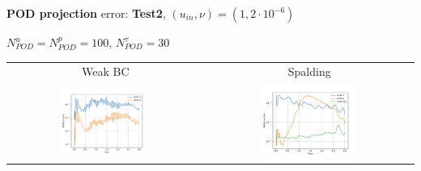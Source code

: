 \documentclass[9pt,compress,t,aspectratio=169]{beamer}
\newcommand{\1}{\begin{pmatrix}
		1\\
		1
\end{pmatrix}}
\newcommand{\highlight}[1]{\textbf{\color{bluemathlab}#1}}
\newcommand{\highlightB}[1]{\textbf{\color{black!15!orangemathlab}#1}}
\begin{document}
\begin{frame}{\highlight{POD projection }error: \highlightB{Test2}, $(u_{in},\nu)=(1,2\cdot 10^{-6})$}
	\begin{center}
		$N_{POD}^u=N_{POD}^p=100$, $N_{POD}^\tau=30$
		\begin{tabular}{cc}
			Weak BC& Spalding\\
			\includegraphics[width=0.49\textwidth]{figures/cylinder_turb_weak_errors_vs_time_proj.pdf}&
			\includegraphics[width=0.49\textwidth]{figures/cylinder_turb_spalding_errors_vs_time_proj.pdf}
		\end{tabular}
	\end{center}
\end{frame}
\end{document}
